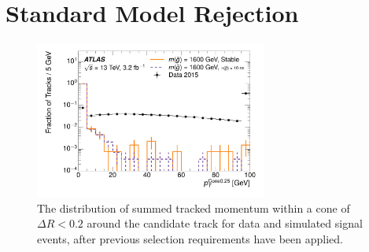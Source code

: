
\section{Standard Model Rejection}
\label{sec:sm_rejection}



\begin{figure}[h]
\centering
\includegraphics[width=0.68\textwidth]{figures/selection_isopt_nm1.pdf}
\caption{The distribution of summed tracked momentum within a cone of $\Delta R < 0.2$ around the candidate track for data and simulated signal events, after previous selection requirements have been applied.}
\label{fig:nm1_isopt}
\end{figure}

